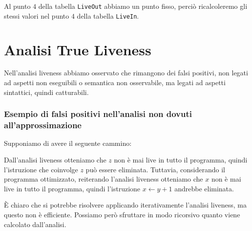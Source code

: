 Al punto $4$ della tabella \texttt{LiveOut} abbiamo un punto fisso, perciò 
ricalcoleremo gli stessi valori nel punto $4$ della tabella \texttt{LiveIn}.

\section{Analisi True Liveness}
Nell'analisi liveness abbiamo osservato che rimangono dei falsi positivi,
non legati ad aspetti non eseguibili o semantica non osservabile, ma legati 
ad aspetti sintattici, quindi catturabili.

\subsubsection{Esempio di falsi positivi nell'analisi non dovuti all'approssimazione}
Supponiamo di avere il seguente cammino:

Dall'analisi liveness otteniamo che $z$ non è mai live in tutto il programma, 
quindi l'istruzione che coinvolge $z$ può essere eliminata. Tuttavia, considerando il programma
ottimizzato, reiterando l'analisi liveness otteniamo che $x$ non è mai live in tutto il programma,
quindi l'istruzione $x \gets y + 1$ andrebbe eliminata.

È chiaro che si potrebbe risolvere applicando iterativamente l'analisi liveness, ma questo
non è efficiente. Possiamo però sfruttare in modo ricorsivo quanto viene calcolato dall'analisi.

